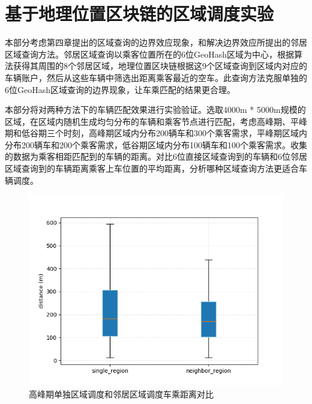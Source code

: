 \section{基于地理位置区块链的区域调度实验}

本部分考虑第四章提出的区域查询的边界效应现象，和解决边界效应所提出的邻居区域查询方法。邻居区域查询以乘客位置所在的6位GeoHash区域为中心，根据算法获得其周围的8个邻居区域，地理位置区块链根据这9个区域查询到区域内对应的车辆账户，然后从这些车辆中筛选出距离乘客最近的空车。此查询方法克服单独的6位GeoHash区域查询的边界现象，让车乘匹配的结果更合理。

本部分将对两种方法下的车辆匹配效果进行实验验证。选取4000m * 5000m规模的区域，在区域内随机生成均匀分布的车辆和乘客节点进行匹配，考虑高峰期、平峰期和低谷期三个时刻，高峰期区域内分布200辆车和300个乘客需求，平峰期区域内分布200辆车和200个乘客需求，低谷期区域内分布100辆车和100个乘客需求。收集的数据为乘客相距匹配到的车辆的距离。对比6位直接区域查询到的车辆和6位邻居区域查询到的车辆距离乘客上车位置的平均距离，分析哪种区域查询方法更适合车辆调度。

\begin{figure}
  \centering
  \includegraphics[width=1.0\textwidth]{figures/高峰车乘匹配}
  \caption{高峰期单独区域调度和邻居区域调度车乘距离对比}\label{fig:highRegionDistance}
\end{figure}

